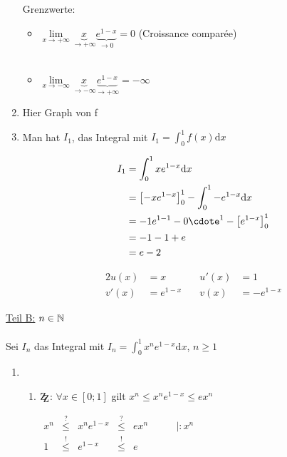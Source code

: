 \begin{Beweis}
\begin{enumerate}
Grenzwerte:
\begin{itemize}
\item$\lim\limits_{x\to +\infty}\underbrace{x}_{\rightarrow+\infty}\underbrace{e^{1-x}}_{\rightarrow0}=0$ (Croissance comparée)\\\\
\item$\lim\limits_{x\to -\infty}\underbrace{x}_{\rightarrow-\infty}\underbrace{e^{1-x}}_{\rightarrow+\infty}=-\infty$\\
\end{itemize}
\item Hier Graph von f
\item Man hat $I_1$,  das Integral mit $I_1=\int_0^1f(x)\mbox{d}x$\\
\begin{minipage}{0.5\textwidth}
\begin{align*}
I_1&=\int_0^1xe^{1-x}\mbox{d}x\\
&=\left[-xe^{1-x}\right]_0^1-\int_0^1-e^{1-x}\mbox{d}x\\
&=-1e^{1-1}-0\cdote^1-\left[e^{1-x}\right]_0^1\\
&=-1-1+e\\
&=e-2
\end{align*}
\end{minipage}
\begin{minipage}{0.5\textwidth}
\begin{alignat*}{2}
u(x)&=x \quad& u\prime(x)&=1\\
v'(x)&=e^{1-x}\quad & v(x)&=-e^{1-x}
\end{alignat*}
\end{minipage}
\end{enumerate}
\underline{Teil B:} $n\in\mathbb{N}$\\\\
Sei $I_n$ das Integral mit $I_n=\int_0^1x^ne^{1-x}\mbox{d}x$, $n\geq 1$\\
\begin{enumerate}
\item %
\begin{enumerate}
\item $\zz$: $\forall x\in[0;1]$ gilt $x^n\leq x^ne^{1-x} \leq ex^n$\\
\begin{center}
$\begin{array}{cccccc}
x^n &\stackrel{?}{\leq}& x^ne^{1-x} &\stackrel{?}{\leq}& ex^n&\qquad|:x^n\\
1        &\stackrel{!}{\leq}&e^{1-x}         &\stackrel{!}{\leq}&e        &
\end{array}$

\end{center}
\end{enumerate}
\end{enumerate}
\end{Beweis}

